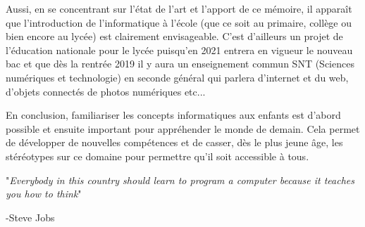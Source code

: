 Aussi, en se concentrant sur l'état de l'art et l'apport de ce mémoire, il apparaît que l'introduction de l'informatique à l'école (que ce soit au primaire, collège ou bien encore au lycée) est clairement envisageable. C'est d'ailleurs un projet de l'éducation nationale pour le lycée puisqu'en 2021 entrera en vigueur le nouveau bac et que dès la rentrée 2019 il y aura un enseignement commun SNT (Sciences numériques et technologie) en seconde général qui parlera d'internet et du web, d'objets connectés de photos numériques etc... \cite{69}

En conclusion, familiariser les concepts informatiques aux enfants est d'abord possible et ensuite important pour appréhender le monde de demain. Cela permet de développer de nouvelles compétences et de casser, dès le plus jeune âge, les stéréotypes sur ce domaine pour permettre qu'il soit accessible à tous.

"\textit{Everybody in this country should learn to program a computer because it teaches you how to think}"

-Steve Jobs

